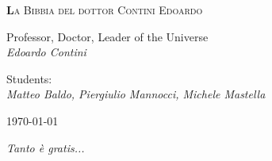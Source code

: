 \begin{titlepage}

	\centering
	{\scshape\huge\textbf La Bibbia del dottor Contini Edoardo \par}
	\vspace{13cm}
{Professor, Doctor, Leader of the Universe\\ \textit{Edoardo Contini}}	

\vspace{0.5cm}

{Students:\\ \textit{Matteo Baldo, Piergiulio Mannocci, Michele Mastella}}


\vspace{2cm}
	\vfill
	\raggedleft
	{\today\par}

\vspace{1cm}
\raggedright
{ \it Tanto è gratis...}
	
\end{titlepage}
        \newpage
		\setcounter{page}{1}
        \null 
        \thispagestyle{empty} 
        \newpage  


